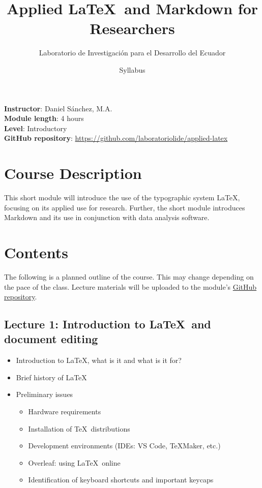 \documentclass[a4paper,11pt]{article}
\title{Applied \LaTeX \ and Markdown for Researchers}
\author{Laboratorio de Investigación para el Desarrollo del Ecuador}
\date{Syllabus}
\begin{document}
\maketitle

\noindent \textbf{Instructor}: Daniel Sánchez, M.A. \\
\textbf{Module length}: 4 hours \\
\textbf{Level}: Introductory \\
\textbf{GitHub repository}: \url{https://github.com/laboratoriolide/applied-latex}

\section{Course Description}

This short module will introduce the use of the typographic system \LaTeX, focusing on its applied use for research. Further, the short module introduces Markdown and its use in conjunction with data analysis software. 

\section{Contents}

The following is a planned outline of the course. This may change depending on the pace of the
class. Lecture materials will be uploaded to the module's \href{https://github.com/laboratoriolide/applied-latex}{GitHub repository}.

\subsection{Lecture 1: Introduction to \LaTeX \ and document editing}

\begin{itemize}
    \item Introduction to \LaTeX, what is it and what is it for?
    \item Brief history of \LaTeX
    \item Preliminary issues
    \begin{itemize}
        \item Hardware requirements
        \item Installation of \TeX \ distributions
        \item Development environments (IDEs: VS Code, \TeX Maker, etc.)
        \item Overleaf: using \LaTeX \ online
        \item Identification of keyboard shortcuts and important keycaps
    \end{itemize}
\end{itemize}
\end{document}
